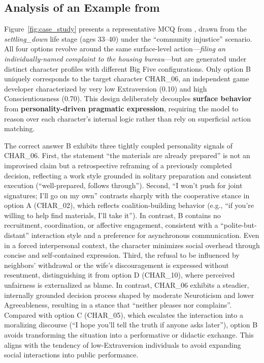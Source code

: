 \subsection{Analysis of an Example from \ourbench}
\label{app:case_study}
Figure~\ref{fig:case_study} presents a representative MCQ from \ourbench, drawn from the \emph{settling\_down} life stage (ages 33--40) under the ``community injustice'' scenario. All four options revolve around the same surface-level action---\emph{filing an individually-named complaint to the housing bureau}---but are generated under distinct character profiles with different Big Five configurations. Only option B uniquely corresponds to the target character CHAR\_06, an independent game developer characterized by very low Extraversion (0.10) and high Conscientiousness (0.70). This design deliberately decouples \textbf{surface behavior} from \textbf{personality-driven pragmatic expression}, requiring the model to reason over each character's internal logic rather than rely on superficial action matching.

The correct answer B exhibits three tightly coupled personality signals of CHAR\_06. First, the statement ``the materials are already prepared'' is not an improvised claim but a retrospective reframing of a previously completed decision, reflecting a work style grounded in solitary preparation and consistent execution (``well-prepared, follows through''). Second, ``I won't push for joint signatures; I'll go on my own'' contrasts sharply with the cooperative stance in option A (CHAR\_02), which reflects coalition-building behavior (e.g., ``if you're willing to help find materials, I'll take it''). In contrast, B contains no recruitment, coordination, or affective engagement, consistent with a ``polite-but-distant'' interaction style and a preference for asynchronous communication. Even in a forced interpersonal context, the character minimizes social overhead through concise and self-contained expression. Third, the refusal to be influenced by neighbors' withdrawal or the wife's discouragement is expressed without resentment, distinguishing it from option D (CHAR\_10), where perceived unfairness is externalized as blame. In contrast, CHAR\_06 exhibits a steadier, internally grounded decision process shaped by moderate Neuroticism and lower Agreeableness, resulting in a stance that ``neither pleases nor complains''. Compared with option C (CHAR\_05), which escalates the interaction into a moralizing discourse (``I hope you'll tell the truth if anyone asks later''), option B avoids transforming the situation into a performative or didactic exchange. This aligns with the tendency of low-Extraversion individuals to avoid expanding social interactions into public performance.

